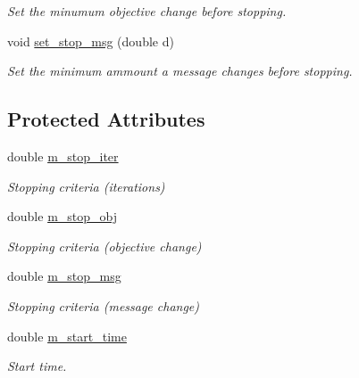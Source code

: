 \begin{DoxyCompactItemize}
\begin{DoxyCompactList}\small\item\em Set the minumum objective change before stopping. \end{DoxyCompactList}\item 
void \hyperlink{classmerlin_1_1algorithm_a9ec636be897b4ca62a3dc3bb493472e4}{set\+\_\+stop\+\_\+msg} (double d)
\begin{DoxyCompactList}\small\item\em Set the minimum ammount a message changes before stopping. \end{DoxyCompactList}\end{DoxyCompactItemize}
\subsection*{Protected Attributes}
\begin{DoxyCompactItemize}
\item 
double \hyperlink{classmerlin_1_1algorithm_a292ad6727f86126574943414afcd4196}{m\+\_\+stop\+\_\+iter}\hypertarget{classmerlin_1_1algorithm_a292ad6727f86126574943414afcd4196}{}\label{classmerlin_1_1algorithm_a292ad6727f86126574943414afcd4196}

\begin{DoxyCompactList}\small\item\em Stopping criteria (iterations) \end{DoxyCompactList}\item 
double \hyperlink{classmerlin_1_1algorithm_afe10662910ee8c4349a17684fd799a9b}{m\+\_\+stop\+\_\+obj}\hypertarget{classmerlin_1_1algorithm_afe10662910ee8c4349a17684fd799a9b}{}\label{classmerlin_1_1algorithm_afe10662910ee8c4349a17684fd799a9b}

\begin{DoxyCompactList}\small\item\em Stopping criteria (objective change) \end{DoxyCompactList}\item 
double \hyperlink{classmerlin_1_1algorithm_a3ad7c9e3331f03f7010e466da2e951dd}{m\+\_\+stop\+\_\+msg}\hypertarget{classmerlin_1_1algorithm_a3ad7c9e3331f03f7010e466da2e951dd}{}\label{classmerlin_1_1algorithm_a3ad7c9e3331f03f7010e466da2e951dd}

\begin{DoxyCompactList}\small\item\em Stopping criteria (message change) \end{DoxyCompactList}\item 
double \hyperlink{classmerlin_1_1algorithm_a8102421ee6a9ccc1378a808540613a4b}{m\+\_\+start\+\_\+time}\hypertarget{classmerlin_1_1algorithm_a8102421ee6a9ccc1378a808540613a4b}{}\label{classmerlin_1_1algorithm_a8102421ee6a9ccc1378a808540613a4b}

\begin{DoxyCompactList}\small\item\em Start time. \end{DoxyCompactList}\end{DoxyCompactItemize}


